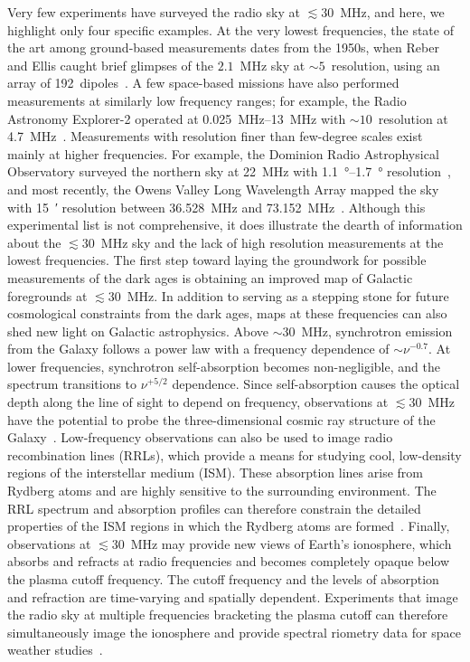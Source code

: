 \documentclass{ws-jai}
\begin{document}
Very few experiments have surveyed the radio sky at $\lesssim 30$~MHz,
and here, we highlight only four specific examples.  At the very
lowest frequencies, the state of the art among ground-based
measurements dates from the 1950s, when Reber and Ellis caught brief
glimpses of the $2.1$~MHz sky at $\sim 5$\degree\ resolution, using an
array of 192~dipoles~\citep{1956JGR....61....1R}.  A few space-based
missions have also performed measurements at similarly low frequency
ranges; for example, the Radio Astronomy Explorer-2 operated at
\SIrange{0.025}{13}{\MHz} with $\sim 10$\degree\ resolution at
\SI{4.7}{\MHz}~\citep{1975A&A....40..365A}.  Measurements with
resolution finer than few-degree scales exist mainly at higher
frequencies.  For example, the Dominion Radio Astrophysical
Observatory surveyed the northern sky at \SI{22}{\MHz} with
\SIrange{1.1}{1.7}{\degree} resolution~\citep{1999A&AS..137....7R},
and most recently, the Owens Valley Long Wavelength Array mapped the
sky with \SI{15}{\arcminute} resolution between 36.528~MHz and
73.152~MHz~\citep{2018AJ....156...32E}.  Although this experimental
list is not comprehensive, it does illustrate the dearth of
information about the $\lesssim 30$~MHz sky and the lack of high
resolution measurements at the lowest frequencies.  The first step
toward laying the groundwork for possible measurements of the dark
ages is obtaining an improved map of Galactic foregrounds at $\lesssim
30$~MHz.  In addition to serving as a stepping stone for future
cosmological constraints from the dark ages, maps at these frequencies
can also shed new light on Galactic astrophysics.  Above $\sim30$~MHz,
synchrotron emission from the Galaxy follows a power law with a
frequency dependence of $\sim \nu^{-0.7}$.  At lower frequencies,
synchrotron self-absorption becomes non-negligible, and the spectrum
transitions to $\nu^{+5/2}$ dependence.  Since self-absorption causes
the optical depth along the line of sight to depend on frequency,
observations at $\lesssim 30$~MHz have the potential to probe the
three-dimensional cosmic ray structure of the
Galaxy~\citep{2002ApJ...575..217P}.  Low-frequency observations can
also be used to image radio recombination lines (RRLs), which provide
a means for studying cool, low-density regions of the interstellar
medium (ISM).  These absorption lines arise from Rydberg atoms and are
highly sensitive to the surrounding environment.  The RRL spectrum and
absorption profiles can therefore constrain the detailed properties of
the ISM regions in which the Rydberg atoms are
formed~\citep{2009NewAR..53..259G, 2007MNRAS.374..852S}.  Finally,
observations at $\lesssim30$~MHz may provide new views of Earth's
ionosphere, which absorbs and refracts at radio frequencies and
becomes completely opaque below the plasma cutoff frequency.  The
cutoff frequency and the levels of absorption and refraction are
time-varying and spatially dependent.  Experiments that image the
radio sky at multiple frequencies bracketing the plasma cutoff can
therefore simultaneously image the ionosphere and provide spectral
riometry data for space weather studies~\citep{2014GeoRL..41.5370K}.
\end{document}
